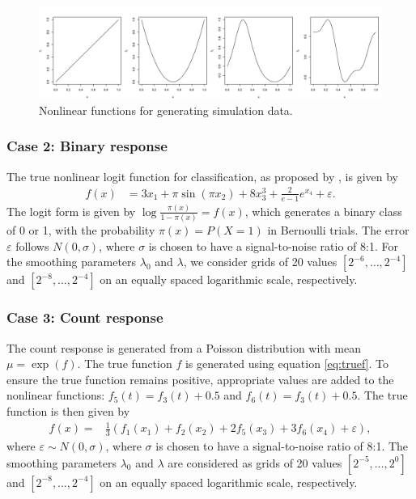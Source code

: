 \begin{figure}
\includegraphics[width=52.44in]{figures/nonlinear_funcs} \caption{Nonlinear functions for generating simulation data.}\label{fig:fig-nonlinear}
\end{figure}

\hypertarget{case-2-binary-response}{%
\subsubsection{Case 2: Binary response}\label{case-2-binary-response}}

The true nonlinear logit function for classification, as proposed by \citet{Lin:2006}, is given by
\begin{align*}
    f(x) &= 3x_1 + \pi \sin(\pi x_2) + 8 x_3^3 + \frac{2}{e - 1} e^{x_4} + \varepsilon.
\end{align*}
The logit form is given by \(\log \frac{\pi(x)}{1-\pi(x)}=f(x)\), which generates a binary class of 0 or 1, with the probability \(\pi(x)=P(X=1)\) in Bernoulli trials. The error \(\varepsilon\) follows \(N(0, \sigma)\), where \(\sigma\) is chosen to have a signal-to-noise ratio of 8:1. For the smoothing parameters \(\lambda_0\) and \(\lambda\), we consider grids of 20 values \([2^{-6}, \dots, 2^{-4}]\) and \([2^{-8}, \dots, 2^{-4}]\) on an equally spaced logarithmic scale, respectively.

\hypertarget{case-3-count-response}{%
\subsubsection{Case 3: Count response}\label{case-3-count-response}}

The count response is generated from a Poisson distribution with mean \(\mu=\exp(f)\). The true function \(f\) is generated using equation \eqref{eq:truef}. To ensure the true function remains positive, appropriate values are added to the nonlinear functions: \(f_5(t) = f_3(t) + 0.5\) and \(f_6(t) = f_3(t) + 0.5\). The true function is then given by
\begin{align*}
    f(x) =&  \frac{1}{3}(f_1(x_1) + f_2(x_2) + 2 f_5(x_3) + 3 f_6(x_4) + \varepsilon),
\end{align*}
where \(\varepsilon \sim N(0, \sigma)\), where \(\sigma\) is chosen to have a signal-to-noise ratio of 8:1. The smoothing parameters \(\lambda_0\) and \(\lambda\) are considered as grids of 20 values \([2^{-5}, \dots, 2^{0}]\) and \([2^{-8}, \dots, 2^{-4}]\) on an equally spaced logarithmic scale, respectively.

